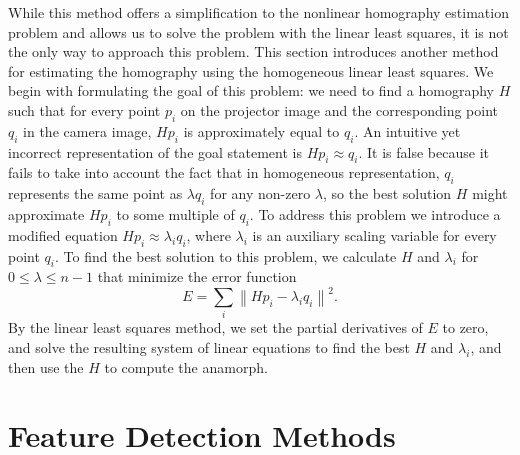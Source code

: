 \documentclass[11pt, oneside, reqno]{book}
\begin{document}
While this method offers a simplification to the nonlinear homography estimation problem and allows us to solve the problem with the linear least squares, it is not the only way to approach this problem.
This section introduces another method for estimating the homography using the homogeneous linear least squares. We begin with formulating the goal of this problem: we need to find a homography $H$ such that for every point $p_i$ on the projector image and the corresponding point $q_i$ in the camera image, $Hp_i$ is approximately equal to $q_i$. An intuitive yet incorrect representation of the goal statement is $Hp_i \approx q_i$. It is false because it fails to take into account the fact that in homogeneous representation, $q_i$ represents the same point as $\lambda q_i$ for any non-zero $\lambda$, so the best solution $H$ might approximate $Hp_i$ to some multiple of $q_i$. To address this problem we introduce a modified equation $Hp_i \approx \lambda_i q_i$, where $\lambda_i$ is an auxiliary scaling variable for every point $q_i$. To find the best solution to this problem, we calculate $H$ and $\lambda_i$ for $0 \le \lambda \le n-1$ that minimize the error function 
\[
E = \sum_i 
\left\| Hp_i - \lambda_i q_i \right\|^2.
\]
By the linear least squares method, we set the partial derivatives of $E$ to zero, and solve the resulting system of linear equations to find the best $H$ and $\lambda_i$, and then use the $H$ to compute the anamorph.











\section{Feature Detection Methods}
\label{sec:featureDetections}
\end{document}
